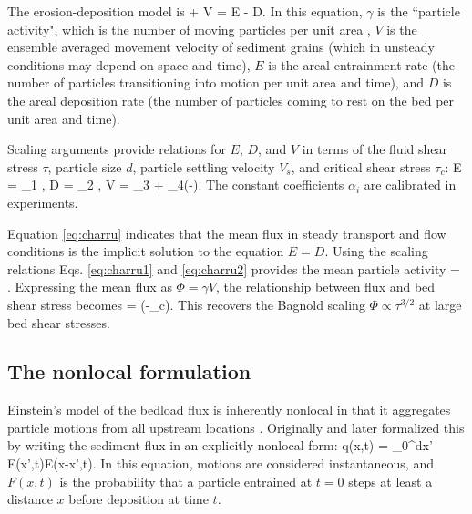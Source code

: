 The erosion-deposition model is
\be \pt \gamma +  \px V \gamma = E - D. \label{eq:charru}\ee
In this equation, $\gamma$ is the ``particle activity", which is the number of moving particles per unit area \citep{Furbish2012}, $V$ is the ensemble averaged movement velocity of sediment grains (which in unsteady conditions may depend on space and time), $E$ is the areal entrainment rate (the number of particles transitioning into motion per unit area and time), and $D$ is the areal deposition rate (the number of particles coming to rest on the bed per unit area and time).

Scaling arguments provide relations for $E$, $D$, and $V$ in terms of the fluid shear stress $\tau$, particle size $d$, particle settling velocity $V_s$, and critical shear stress $\tau_c$:
\be E = \alpha_1 , \label{eq:charru1}\ee
\be D  = \alpha_2 , \ee
\be V = \alpha_3 + \alpha_4(\sqrt{\tau}-). \label{eq:charru2}\ee
The constant coefficients $\alpha_i$ are calibrated in experiments.

Equation \ref{eq:charru} indicates that the mean flux in steady transport and flow conditions is the implicit solution to the equation $E = D.$
Using the scaling relations Eqs. \ref{eq:charru1} and \ref{eq:charru2} provides the mean particle activity
\be \gamma = .\ee
Expressing the mean flux as $\Phi = \gamma V$, the relationship between flux and bed shear stress becomes
\be \Phi = \big(\tau-\tau_c\big). \ee
This recovers the Bagnold scaling $\Phi \propto \tau^{3/2}$ at large bed shear stresses.

\subsection{The nonlocal formulation}
\label{sec:nonlocal}

Einstein's model of the bedload flux is inherently nonlocal in that it aggregates particle motions from all upstream locations \citep{Schumer2009,Tucker2010a,Martin2012}. 
Originally \citet{Nakagawa1976} and later \citet{Parker2000} formalized this by writing the sediment flux in an explicitly nonlocal form:
\be q(x,t) = \int_0^\infty dx' F(x',t)E(x-x',t). \ee
In this equation, motions are considered instantaneous, and $F(x,t)$ is the probability that a particle entrained at $t=0$ steps at least a distance $x$ before deposition at time $t$.

